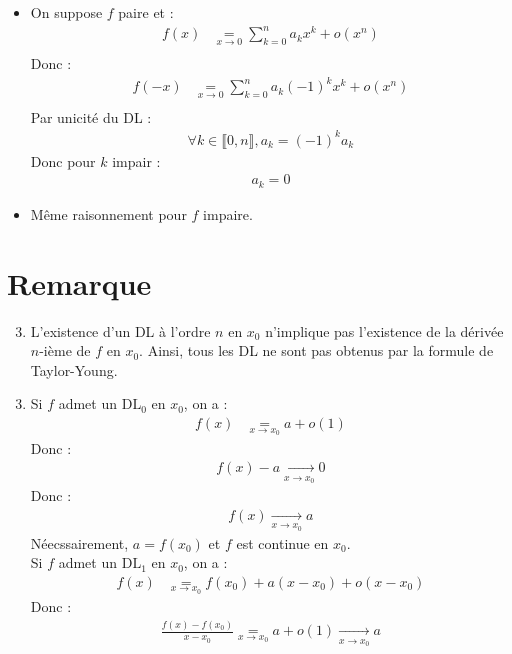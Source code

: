 \documentclass[../main.tex]{subfiles}
\begin{document}
\begin{itemize}
    \item On suppose $f$ paire et : 
    \begin{align*}
        f(x) &\underset{x\to 0}{=} \sum_{k=0}^{n} a_k x^k + o(x^n) \\
    \end{align*}
    Donc : 
    \begin{align*}
        f(-x) &\underset{x\to 0}{=} \sum_{k=0}^{n} a_k (-1)^kx^k + o(x^n) \\
    \end{align*}
    Par unicité du DL : 
    \begin{align*}
        \forall k \in \llbracket 0, n \rrbracket, a_k = (-1)^k a_k
    \end{align*}
    Donc pour $k$ impair : 
    \begin{align*}
        a_k = 0
    \end{align*}
    \item Même raisonnement pour $f$ impaire.
\end{itemize}

\section{Remarque}
\begin{tcolorbox}[title=Remarque 25.42, title filled=false, colframe=lightblue, colback=lightblue!10!white]
    \begin{enumerate}
        \setcounter{enumi}{2}
        \item L'existence d'un DL à l'ordre $n$ en $x_0$ n'implique pas l'existence de la dérivée $n$-ième de $f$ en $x_0$. Ainsi, tous les DL ne sont pas obtenus par la formule de Taylor-Young. 
    \end{enumerate}
\end{tcolorbox}

\begin{enumerate}
    \setcounter{enumi}{2}
    \item Si $f$ admet un $\text{DL}_0$ en $x_0$, on a : 
    \begin{align*}
        f(x) &\underset{x\to x_0}{=} a + o(1)
    \end{align*}
    Donc : 
    \begin{align*}
        f(x) - a \underset{x \to x_0}{\longrightarrow} 0
    \end{align*}
    Donc : 
    \begin{align*}
        f(x) \underset{x \to x_0}{\longrightarrow} a
    \end{align*}
    Néecssairement, $a = f(x_0)$ et $f$ est continue en $x_0$. \\
    Si $f$ admet un $\text{DL}_1$ en $x_0$, on a : 
    \begin{align*}
        f(x) &\underset{x\to x_0}{=} f(x_0) + a (x - x_0) + o(x - x_0)
    \end{align*}
    Donc : 
    \begin{align*}
        \frac{f(x) - f(x_0)}{x - x_0} \underset{x\to x_0}{=} a + o(1) \underset{x \to x_0}{\longrightarrow} a
    \end{align*}
\end{enumerate}
\end{document}
